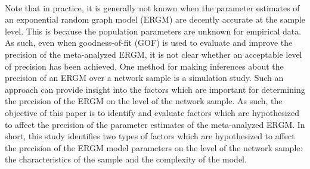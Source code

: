 \documentclass[a4paper, man]{apa6}
\begin{document}
\\
Note that in practice, it is generally not known when the parameter estimates of an exponential random graph model (ERGM) are decently accurate at the sample level. This is because the population parameters are unknown for empirical data. As such, even when goodness-of-fit (GOF) is used to evaluate and improve the precision of the meta-analyzed ERGM, it is not clear whether an acceptable level of precision has been achieved. One method for making inferences about the precision of an ERGM over a network sample is a simulation study. Such an approach can provide insight into the factors which are important for determining the precision of the ERGM on the level of the network sample. As such, the objective of this paper is to identify and evaluate factors which are hypothesized to affect the precision of the parameter estimates of the meta-analyzed ERGM. In short, this study identifies two types of factors which are hypothesized to affect the precision of the ERGM model parameters on the level of the network sample: the characteristics of the sample and the complexity of the model. 
\\
\end{document}
